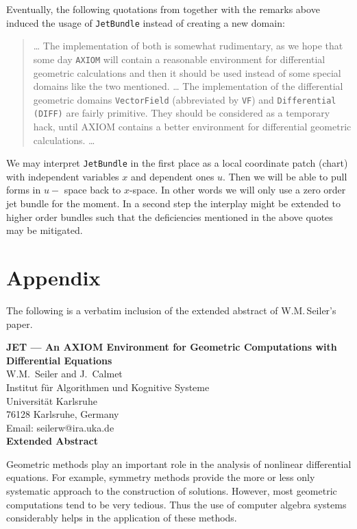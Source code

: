 \documentclass[12pt,a4paper]{article}
\begin{document}
Eventually, the following quotations from \cite{wms:axiom} together
with the remarks above induced the usage of {\tt JetBundle}
instead of creating a new domain:
%
\begin{verse}
\ldots
The implementation of both is somewhat rudimentary, as we hope that some
day {\tt AXIOM} will contain a reasonable environment for differential 
geometric calculations and then it should be used instead of some 
special domains like the two mentioned. 
\ldots
The implementation of the differential geometric domains  {\tt VectorField} 
(abbreviated by {\tt VF}) and {\tt Differential (DIFF)} are fairly primitive. 
They should be considered as a temporary hack, until AXIOM contains 
a better environment for differential geometric calculations.
\ldots
\end{verse}  
%
We may interpret {\tt JetBundle} in the first place as a local
coordinate patch (chart) with independent variables $x$ and
dependent ones $u$. Then we will be able to pull forms in $u-$
space back to $x$-space. In other words we will only use a 
zero order jet bundle for the moment. In a second step the
interplay might be extended to higher order bundles such that
the deficiencies mentioned in the above quotes may be mitigated.
%
\section{Appendix}
The following is a verbatim inclusion of the extended abstract of
W.M.\,Seiler's paper.

\begin{center}
{\bf JET --- An AXIOM Environment for Geometric Computations with
Differential Equations} \\
{ W.M.~Seiler and J.~Calmet\\
        Institut f\"ur Algorithmen und Kognitive Systeme\\
        Universit\"at Karlsruhe\\
        76128 Karlsruhe, Germany\\
        Email: seilerw@ira.uka.de} \\
\bf Extended Abstract
\end{center}

Geometric methods play an important role in the analysis of nonlinear
differential equations. For example, symmetry methods provide the more or less
only systematic approach to the construction of solutions. However, most
geometric computations tend to be very tedious. Thus the use of computer algebra
systems considerably helps in the application of these methods.
\end{document}
